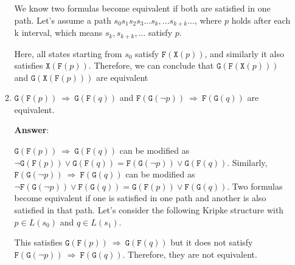 \documentclass[11pt]{article}
\newcommand{\lx}[1]{\texttt{X}(#1)}
\newcommand{\lf}[1]{\texttt{F}(#1)}
\newcommand{\llg}[1]{\texttt{G}(#1)}
\begin{document}
\begin{enumerate}
\begin{enumerate}
    We know two formulas become equivalent if both are satisfied in one path. Let's assume a path $s_0 s_1 s_2 s_3...s_k, ...s_{k+k}...$, where $p$ holds after each k interval, which means $s_k, s_{k+k}, ...$ satisfy $p$. 

    Here, all states starting from $s_0$ satisfy $\lf{\lx{p}}$, and similarly it also satisfies $\lx{\lf{p}}$. Therefore, we can conclude that $\llg{\lf{\lx{p}}}$ and $\llg{\lx{\lf{p}}}$ are equivalent

       
  \item $\llg{\lf{p}} \ \Rightarrow\ \llg{\lf{q}}$ and
    $\lf{\llg{\neg p}} \ \Rightarrow\ \lf{\llg{q}}$ are equivalent.

    \textbf{Answer}: 

    $\llg{\lf{p}} \ \Rightarrow\ \llg{\lf{q}}$ can be modified as $\neg \llg{\lf{p}} \lor \llg{\lf{q}} = \lf{\llg{\neg p}} \lor \llg{\lf{q}}$. Similarly, $\lf{\llg{\neg p}} \ \Rightarrow\ \lf{\llg{q}}$ can be modified as $\neg \lf{\llg{\neg p}} \lor \lf{\llg{q}} = \llg{\lf{p}} \lor \lf{\llg{q}}$. 
    Two formulas become equivalent if one is satisfied in one path and another is also satisfied in that path.  
    Let's consider the following Kripke structure with $p \in L(s_0)$ and $q \in L(s_1)$. 

        \begin{center}
        \end{center}
    This satisfies $\llg{\lf{p}} \ \Rightarrow\ \llg{\lf{q}}$ but it does not satisfy $\lf{\llg{\neg p}} \ \Rightarrow\ \lf{\llg{q}}$. Therefore, they are not equivalent. 


\end{enumerate}
\end{enumerate}
\end{document}
